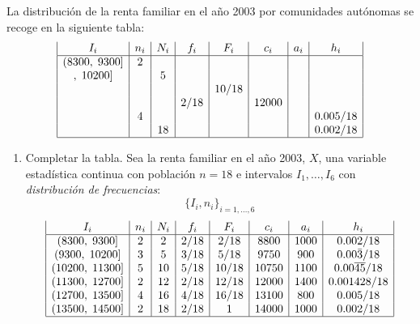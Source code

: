 \begin{ejercicio}
    La distribución de la renta familiar en el año 2003 por comunidades autónomas se recoge en la siguiente tabla:
    \begin{equation*}
            \begin{array}{|c|c|c|c|c|c|c|c|}
                I_i & n_i & N_i & f_i & F_i & c_i& a_i & h_i \\ \hline
                (8300,\;9300]   & 2 &   &   &    &   &   & \\
                ,\;10200]  &   & 5 &   &    &  &   & \\
                 &   &  &  & 10/18  & &  & \\
                 &   &  & 2/18 &   & 12000&  &\\
                 & 4 &  &   &    &  &    & 0.005/18 \\
                 &   & 18&   &        &  &   & 0.002/18 \\ \hline
            \end{array}
        \end{equation*}
    

    \begin{enumerate}
        \item Completar la tabla.
        Sea la renta familiar en el año 2003, $X$, una variable estadística continua con población $n=18$ e intervalos $I_1, \dots, I_{6}$ con \emph{distribución de frecuencias}:
        $$\{I_i, n_i\}_{i=1, \dots, 6}$$
        \begin{equation*}
        \begin{array}{|c|c|c|c|c|c|c|c|}
            I_i & n_i & N_i & f_i & F_i & c_i& a_i & h_i \\ \hline
            (8300,\;9300]   & 2 & 2 & 2/18 & 2/18   & 8800 & 1000 & 0.002/18\\
            (9300,\;10200]  & 3 & 5 & 3/18 & 5/18   & 9750 & 900  & 0.00\bar{3}/18\\
            (10200,\;11300] & 5 & 10& 5/18 & 10/18  & 10750& 1100 & 0.00\overline{45}/18\\
            (11300,\;12700] & 2 & 12& 2/18 & 12/18  & 12000& 1400 & 0.001428/18\\
            (12700,\;13500] & 4 & 16& 4/18 & 16/18  & 13100& 800  & 0.005/18 \\
            (13500,\;14500] & 2 & 18& 2/18 & 1      & 14000& 1000 & 0.002/18 \\ \hline
        \end{array}
    \end{equation*}


\end{enumerate}
\end{ejercicio}

